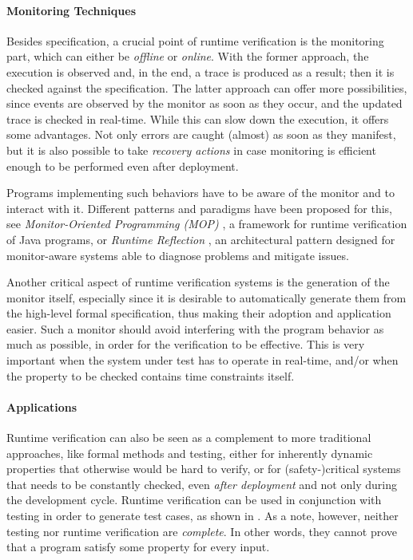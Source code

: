 \paragraph{Monitoring Techniques}
Besides specification, a crucial point of runtime verification is the monitoring part, which can either be \emph{offline} or \emph{online}.
With the former approach, the execution is observed and, in the end, a trace is produced as a result; then it is checked against the specification.
The latter approach can offer more possibilities, since events are observed by the monitor as soon as they occur, and the updated trace is checked in real-time.
While this can slow down the execution, it offers some advantages.
Not only errors are caught (almost) as soon as they manifest, but it is also possible to take \emph{recovery actions} \cite{ancona2015global} in case
monitoring is efficient enough to be performed even after deployment.

Programs implementing such behaviors have to be aware of the monitor and to interact with it.
Different patterns and paradigms have been proposed for this, see \emph{Monitor-Oriented Programming (MOP)} \cite{mop}, a framework for runtime verification of Java programs, or \emph{Runtime Reflection} \cite{rr}, an architectural pattern designed for monitor-aware systems able to diagnose problems and mitigate issues.

Another critical aspect of runtime verification systems is the generation of the monitor itself, especially since it is desirable to automatically generate them from the high-level formal specification, thus making their adoption and application easier.
Such a monitor should avoid interfering with the program behavior as much as possible, in order for the verification to be effective.
This is very important when the system under test has to operate in real-time, and/or when the property to be checked contains time constraints itself.

\paragraph{Applications}
Runtime verification can also be seen as a complement to more traditional approaches, like formal methods and testing, either for inherently dynamic properties that otherwise would be hard to verify, or for (safety-)critical systems that needs to be constantly checked, even \emph{after deployment} and not only during the development cycle.
Runtime verification can be used in conjunction with testing in order to generate test cases, as shown in \cite{artho2005combining}.
As a note, however, neither testing nor runtime verification are \emph{complete}.
In other words, they cannot prove that a program satisfy some property for every input.

